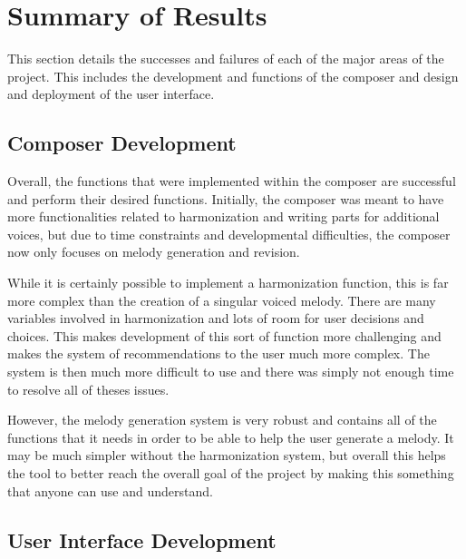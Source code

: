 \section{Summary of Results}
\label{sec:summaryofresults}

This section details the successes and failures of each of the major areas of the project.  This includes the development and functions of the composer and design and deployment of the user interface.

\subsection{Composer Development}
\label{subsec:summaryofresultscomposerdevelopment}

Overall, the functions that were implemented within the composer are successful and perform their desired functions.  Initially, the composer was meant to have more functionalities related to harmonization and writing parts for additional voices, but due to time constraints and developmental difficulties, the composer now only focuses on melody generation and revision.

\vspace{\baselineskip}

While it is certainly possible to implement a harmonization function, this is far more complex than the creation of a singular voiced melody.  There are many variables involved in harmonization and lots of room for user decisions and choices.  This makes development of this sort of function more challenging and makes the system of recommendations to the user much more complex.  The system is then much more difficult to use and there was simply not enough time to resolve all of theses issues.

\vspace{\baselineskip}

However, the melody generation system is very robust and contains all of the functions that it needs in order to be able to help the user generate a melody.  It may be much simpler without the harmonization system, but overall this helps the tool to better reach the overall goal of the project by making this something that anyone can use and understand.

\subsection{User Interface Development}
\label{subsec:summaryofresultsuserinterfacedevelopment}

